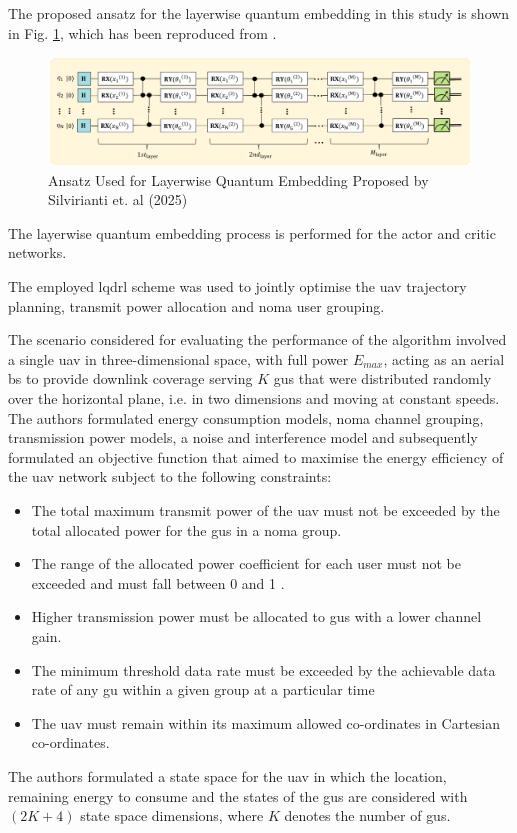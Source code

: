 The proposed ansatz for the layerwise quantum embedding in this study is shown in Fig. \ref{fig:lqdrl_ansatz_silvirianti}, which has been reproduced from \cite{silvirianti_layerwise_2024}. 

\begin{figure}[ht]
    \centering
    \includegraphics[width=1\textwidth]{figures/lq_drl_ansatz.png}
    \caption{Ansatz Used for Layerwise Quantum Embedding Proposed by Silvirianti et. al (2025)}
    \label{fig:lqdrl_ansatz_silvirianti}
\end{figure}
The layerwise quantum embedding process is performed for the actor and critic networks. 

The employed \acrshort{lqdrl} scheme was used to jointly optimise the \acrshort{uav} trajectory planning, transmit power allocation and \acrshort{noma} user grouping. 

The scenario considered for evaluating the performance of the algorithm involved a single \acrshort{uav} in three-dimensional space, with full power $E_{max}$, acting as an aerial \acrshort{bs} to provide downlink coverage serving $K$ \acrshort{gu}s that were distributed randomly over the horizontal plane, i.e. in two dimensions and moving at constant speeds.  
The authors formulated energy consumption models, \acrshort{noma} channel grouping, transmission power models, a noise and interference model and subsequently formulated an objective function that aimed to maximise the energy efficiency of the \acrshort{uav} network subject to the following constraints:
\begin{itemize}
    \item The total maximum transmit power of the \acrshort{uav} must not be exceeded by the total allocated power for the \acrshort{gu}s in a \acrshort{noma} group.
    \item The range of the allocated power coefficient for each user must not be exceeded and must fall between 0 and 1 .
    \item Higher transmission power must be allocated to \acrshort{gu}s with a lower channel gain.
    \item The minimum threshold data rate must be exceeded by the achievable data rate of any \acrshort{gu} within a given group at a particular time
    \item The \acrshort{uav} must remain within its maximum allowed co-ordinates in Cartesian co-ordinates.
\end{itemize}
The authors formulated a state space for the \acrshort{uav} in which the location, remaining energy to consume and the states of the \acrshort{gu}s are considered with $(2K + 4)$ state space dimensions, where $K$ denotes the number of \acrshort{gu}s. 

